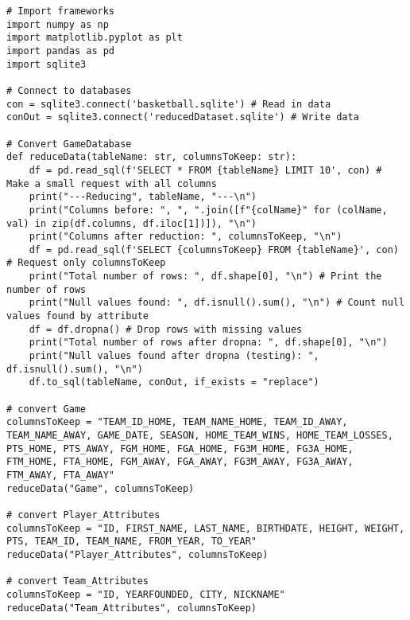 \documentclass{article}
\begin{document}
\begin{verbatim}
# Import frameworks
import numpy as np
import matplotlib.pyplot as plt
import pandas as pd
import sqlite3

# Connect to databases
con = sqlite3.connect('basketball.sqlite') # Read in data
conOut = sqlite3.connect('reducedDataset.sqlite') # Write data

# Convert GameDatabase
def reduceData(tableName: str, columnsToKeep: str):
    df = pd.read_sql(f'SELECT * FROM {tableName} LIMIT 10', con) # Make a small request with all columns
    print("---Reducing", tableName, "---\n")
    print("Columns before: ", ", ".join([f"{colName}" for (colName, val) in zip(df.columns, df.iloc[1])]), "\n")
    print("Columns after reduction: ", columnsToKeep, "\n")
    df = pd.read_sql(f'SELECT {columnsToKeep} FROM {tableName}', con) # Request only columnsToKeep
    print("Total number of rows: ", df.shape[0], "\n") # Print the number of rows 
    print("Null values found: ", df.isnull().sum(), "\n") # Count null values found by attribute
    df = df.dropna() # Drop rows with missing values
    print("Total number of rows after dropna: ", df.shape[0], "\n")
    print("Null values found after dropna (testing): ", df.isnull().sum(), "\n")
    df.to_sql(tableName, conOut, if_exists = "replace")
    
# convert Game
columnsToKeep = "TEAM_ID_HOME, TEAM_NAME_HOME, TEAM_ID_AWAY, TEAM_NAME_AWAY, GAME_DATE, SEASON, HOME_TEAM_WINS, HOME_TEAM_LOSSES, PTS_HOME, PTS_AWAY, FGM_HOME, FGA_HOME, FG3M_HOME, FG3A_HOME, FTM_HOME, FTA_HOME, FGM_AWAY, FGA_AWAY, FG3M_AWAY, FG3A_AWAY, FTM_AWAY, FTA_AWAY"
reduceData("Game", columnsToKeep)

# convert Player_Attributes
columnsToKeep = "ID, FIRST_NAME, LAST_NAME, BIRTHDATE, HEIGHT, WEIGHT, PTS, TEAM_ID, TEAM_NAME, FROM_YEAR, TO_YEAR"
reduceData("Player_Attributes", columnsToKeep)

# convert Team_Attributes
columnsToKeep = "ID, YEARFOUNDED, CITY, NICKNAME"
reduceData("Team_Attributes", columnsToKeep)

\end{verbatim}
\end{document}
